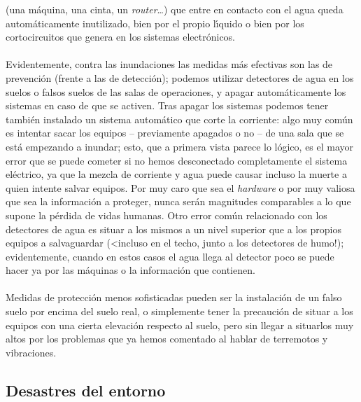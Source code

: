 (una m\'aquina, una cinta, un {\it router}\ldots) que entre en contacto con
el agua queda autom\'aticamente inutilizado, bien por el propio l\'{\i}quido
o bien por los cortocircuitos que genera en los sistemas electr\'onicos.\\
\\Evidentemente, contra las inundaciones las medidas m\'as efectivas son las de
prevenci\'on (frente a las de detecci\'on); podemos utilizar detectores de 
agua en los suelos o falsos suelos de las salas de operaciones, y apagar 
autom\'aticamente los sistemas en caso de que se activen. Tras apagar los 
sistemas podemos tener tambi\'en instalado un sistema autom\'atico que corte
la corriente: algo muy com\'un es intentar sacar los equipos -- previamente 
apagados o no -- de una sala que se est\'a empezando a inundar; esto, que a
primera vista parece lo l\'ogico, es el mayor error que se puede cometer si no
hemos desconectado completamente el sistema el\'ectrico, ya que la mezcla de
corriente y agua puede causar incluso la muerte a quien intente salvar equipos.
Por muy caro que sea el {\it hardware} o por muy valiosa que sea la 
informaci\'on a proteger, nunca ser\'an magnitudes comparables a lo que supone
la p\'erdida de vidas humanas. Otro error com\'un relacionado con los detectores
de agua es situar a los mismos a un nivel superior que a los propios equipos a
salvaguardar (<incluso en el techo, junto a los detectores de humo!); 
evidentemente, cuando en estos casos el agua llega al detector poco se puede 
hacer ya por las m\'aquinas o la informaci\'on que contienen.\\
\\Medidas de protecci\'on menos sofisticadas pueden ser la instalaci\'on de
un falso suelo por encima del suelo real, o simplemente tener la
precauci\'on de situar a los equipos con una cierta elevaci\'on respecto al
suelo, pero sin llegar a situarlos muy altos por los problemas que ya hemos 
comentado al hablar de terremotos y vibraciones.
\subsection{Desastres del entorno}
